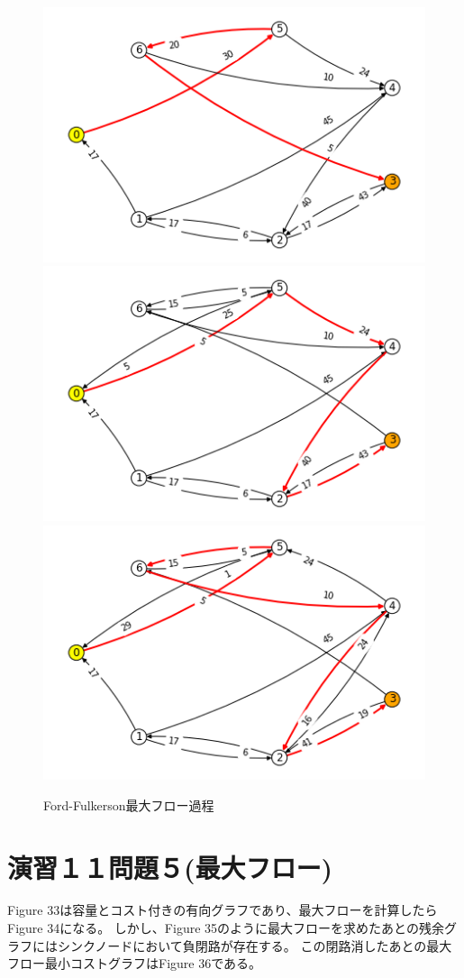 \documentclass{report}
\begin{document}
\begin{CJK}{UTF8}{min}
\begin{figure}
        \includegraphics[width=.49\textwidth]{data/ex11-MF-2.png}
        \\[\smallskipamount]
        \includegraphics[width=.49\textwidth]{data/ex11-MF-3.png}\hfill
        \includegraphics[width=.49\textwidth]{data/ex11-MF-4.png}
        \caption{Ford-Fulkerson最大フロー過程}
    \end{figure}

    \clearpage
    \section*{演習１１問題５(最大フロー)}
    Figure 33は容量とコスト付きの有向グラフであり、最大フローを計算したらFigure 34になる。
    しかし、Figure 35のように最大フローを求めたあとの残余グラフにはシンクノードにおいて負閉路が存在する。
    この閉路消したあとの最大フロー最小コストグラフはFigure 36である。


\end{CJK}
\end{document}
